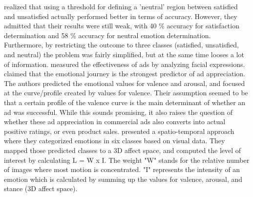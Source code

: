 \noindent \citet{Kamaruddin:2016:MeasuringCustomerSatisfaction} realized that using a threshold for defining a 'neutral' region between satisfied and unsatisfied actually performed better in terms of accuracy. However, they admitted that their results were still weak, with 40 \% accuracy for satisfaction determination and 58 \% accuracy for neutral emotion determination. Furthermore, by restricting the outcome to three classes (satisfied, unsatisfied, and neutral) the problem was fairly simplified, but at the same time looses a lot of information.
\newline\newline
\citet{Poirier:2016:AdsFacialExpression} measured the effectiveness of ads by analyzing facial expressions. \citet{Poirier:2016:AdsFacialExpression} claimed that the emotional journey is the strongest predictor of ad appreciation. The authors predicted the emotional values for valence and arousal, and focused at the curve/profile created by values for valence. Their assumption seemed to be that a certain profile of the valence curve is the main determinant of whether an ad was successful. While this sounds promising, it also raises the question of whether these ad appreciation in commercial ads also converts into actual positive ratings, or even product sales.
\newline\newline
\citet{Yeasin:2006:MeasurmentOfInterestFromVideo} presented a spatio-temporal approach where they categorized emotions in six classes based on visual data. They mapped those predicted classes to a 3D affect space, and computed the level of interest by calculating L = W x I.  The weight "W" stands for the relative number of images where most motion is concentrated. "I" represents the intensity of an emotion which is calculated by summing up the values for valence, arousal, and stance (3D affect space).

